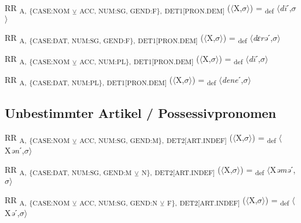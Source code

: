 {\begin{exe}
 RR \textsubscript{A,} \textsubscript{\{CASE:NOM} \textsubscript{${\veebar}$}\textsubscript{ ACC, NUM:SG, GEND:F\},} \textsubscript{DET1[PRON.DEM]} ($\langle$X,$\sigma $$\rangle$) = \textsubscript{def} $\langle$\textit{d\=i}ˊ,$\sigma $$\rangle$
\end{exe}

\begin{exe}
 RR \textsubscript{A,} \textsubscript{\{CASE:DAT, NUM:SG, GEND:F\},} \textsubscript{DET1[PRON.DEM]} ($\langle$X,$\sigma $$\rangle$) = \textsubscript{def} $\langle$\textit{dɛrə}ˊ,$\sigma $$\rangle$
\end{exe}

\begin{exe}
 RR \textsubscript{A,} \textsubscript{\{CASE:NOM} \textsubscript{${\veebar}$}\textsubscript{ ACC, NUM:PL\},} \textsubscript{DET1[PRON.DEM]} ($\langle$X,$\sigma $$\rangle$) = \textsubscript{def} $\langle$\textit{d\=i}ˊ,$\sigma $$\rangle$
\end{exe}

\begin{exe}
 RR \textsubscript{A,} \textsubscript{\{CASE:DAT, NUM:PL\},} \textsubscript{DET1[PRON.DEM]} ($\langle$X,$\sigma $$\rangle$) = \textsubscript{def} $\langle$\textit{dene}ˊ,$\sigma $$\rangle$
\end{exe}

\subsection{Unbestimmter Artikel / Possessivpronomen}

\begin{exe}
 RR \textsubscript{A,} \textsubscript{\{CASE:NOM} \textsubscript{${\veebar}$}\textsubscript{ ACC, NUM:SG, GEND:M\},} \textsubscript{DET2[ART.INDEF]} ($\langle$X,$\sigma $$\rangle$) = \textsubscript{def} $\langle$X\textit{ən}ˊ,$\sigma $$\rangle$
\end{exe}

\begin{exe}
 RR \textsubscript{A,} \textsubscript{\{CASE:DAT, NUM:SG, GEND:M} \textsubscript{${\veebar}$}\textsubscript{ N\},} \textsubscript{DET2[ART.INDEF]} ($\langle$X,$\sigma $$\rangle$) = \textsubscript{def} $\langle$X\textit{əmə}ˊ,$\sigma $$\rangle$
\end{exe}

\begin{exe}
 RR \textsubscript{A,} \textsubscript{\{CASE:NOM} \textsubscript{${\veebar}$}\textsubscript{ ACC, NUM:SG, GEND:N} \textsubscript{${\veebar}$}\textsubscript{ F\},} \textsubscript{DET2[ART.INDEF]} ($\langle$X,$\sigma $$\rangle$) = \textsubscript{def} $\langle$X\textit{ə}ˊ,$\sigma $$\rangle$
\end{exe}

}
